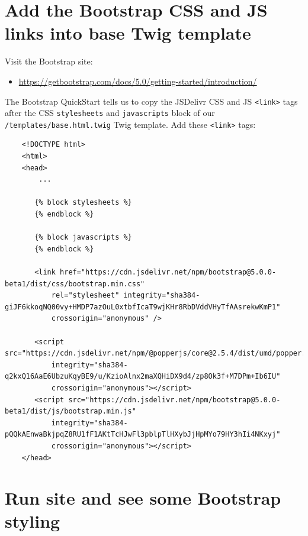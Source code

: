 \documentclass[a4paperpaper,openright]{book}
\providecommand{\tightlist}{%
  \setlength{\itemsep}{0pt}\setlength{\parskip}{0pt}}
\begin{document}
\hypertarget{add-the-bootstrap-css-and-js-links-into-base-twig-template}{%
\section{Add the Bootstrap CSS and JS links into base Twig
template}\label{add-the-bootstrap-css-and-js-links-into-base-twig-template}}

Visit the Bootstrap site:

\begin{itemize}
\tightlist
\item
  \url{https://getbootstrap.com/docs/5.0/getting-started/introduction/}
\end{itemize}

The Bootstrap QuickStart tells us to copy the JSDelivr CSS and JS
\texttt{\textless{}link\textgreater{}} tags after the CSS
\texttt{stylesheets} and \texttt{javascripts} block of our
\texttt{/templates/base.html.twig} Twig template. Add these
\texttt{\textless{}link\textgreater{}} tags:

\begin{verbatim}
    <!DOCTYPE html>
    <html>
    <head>
        ...

       {% block stylesheets %}
       {% endblock %}

       {% block javascripts %}
       {% endblock %}

       <link href="https://cdn.jsdelivr.net/npm/bootstrap@5.0.0-beta1/dist/css/bootstrap.min.css"
           rel="stylesheet" integrity="sha384-giJF6kkoqNQ00vy+HMDP7azOuL0xtbfIcaT9wjKHr8RbDVddVHyTfAAsrekwKmP1"
           crossorigin="anonymous" />

       <script src="https://cdn.jsdelivr.net/npm/@popperjs/core@2.5.4/dist/umd/popper.min.js"
           integrity="sha384-q2kxQ16AaE6UbzuKqyBE9/u/KzioAlnx2maXQHiDX9d4/zp8Ok3f+M7DPm+Ib6IU"
           crossorigin="anonymous"></script>
       <script src="https://cdn.jsdelivr.net/npm/bootstrap@5.0.0-beta1/dist/js/bootstrap.min.js"
           integrity="sha384-pQQkAEnwaBkjpqZ8RU1fF1AKtTcHJwFl3pblpTlHXybJjHpMYo79HY3hIi4NKxyj"
           crossorigin="anonymous"></script>
    </head>
\end{verbatim}

\hypertarget{run-site-and-see-some-bootstrap-styling}{%
\section{Run site and see some Bootstrap
styling}\label{run-site-and-see-some-bootstrap-styling}}
\end{document}

